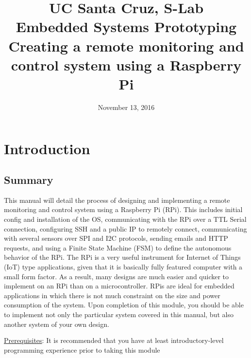 \documentclass{article}
\title{
  UC Santa Cruz, S-Lab \\
  \colorbox{BurntOrange}{\textbf{Embedded Systems Prototyping}} \\
  Creating a remote monitoring and control system using a Raspberry Pi \\
}
\date{November 13, 2016}
\begin{document}
\maketitle

\tableofcontents

\section{Introduction}
  \subsection{Summary}
  This manual will detail the process of designing and implementing a remote monitoring and control system using a Raspberry Pi (RPi). This includes initial config and installation of the OS, communicating with the RPi over a TTL Serial connection, configuring SSH and a public IP to remotely connect, communicating with several sensors over SPI and I2C protocols, sending emails and HTTP requests, and using a Finite State Machine (FSM) to define the autonomous behavior of the RPi.
  The RPi is a very useful instrument for Internet of Things (IoT) type applications, given that it is basically fully featured computer with a small form factor. As a result, many designs are much easier and quicker to implement on an RPi than on a microcontroller. RPis are ideal for embedded applications in which there is not much constraint on the size and power consumption of the system. Upon completion of this module, you should be able to implement not only the particular system covered in this manual, but also another system of your own design.

  \underline{Prerequisites}: It is recommended that you have at least introductory-level programming experience prior to taking this module
\end{document}
